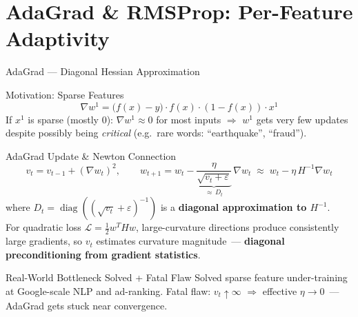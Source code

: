 \documentclass{beamer}
\begin{document}
\section{AdaGrad \& RMSProp: Per-Feature Adaptivity}

\begin{frame}[shrink=10]{AdaGrad --- Diagonal Hessian Approximation}
  \begin{block}{Motivation: Sparse Features}
    \[
      \nabla w^1 = \bigl(f(x)-y\bigr)\cdot f(x)\cdot(1-f(x))\cdot x^1
    \]
    If $x^1$ is sparse (mostly 0): $\nabla w^1 \approx 0$ for most
    inputs $\Rightarrow$ $w^1$ gets very few updates despite possibly
    being \emph{critical} (e.g.\ rare words: ``earthquake'', ``fraud'').
  \end{block}

  \medskip

  \begin{block}{AdaGrad Update \& Newton Connection}
    \[
      v_t = v_{t-1} + (\nabla w_t)^2,
      \qquad
      w_{t+1} = w_t
        - \underbrace{\frac{\eta}{\sqrt{v_t+\varepsilon}}}_{\approx\,D_t}
        \,\nabla w_t
      \;\approx\; w_t - \eta\,H^{-1}\nabla w_t
    \]
    where $D_t = \operatorname{diag}((\sqrt{v_t}+\varepsilon)^{-1})$
    is a \textbf{diagonal approximation to $H^{-1}$}.\\[4pt]
    For quadratic loss $\mathcal{L}=\tfrac{1}{2}w^THw$,
    large-curvature directions produce consistently large gradients,
    so $v_t$ estimates curvature magnitude~---
    \textbf{diagonal preconditioning from gradient statistics}.
  \end{block}

  \begin{alertblock}{Real-World Bottleneck Solved + Fatal Flaw}
    Solved sparse feature under-training at Google-scale NLP and
    ad-ranking.
    Fatal flaw: $v_t\!\uparrow\infty$
    $\Rightarrow$ effective $\eta\!\to 0$~---
    AdaGrad gets stuck near convergence.
  \end{alertblock}
\end{frame}
\end{document}
